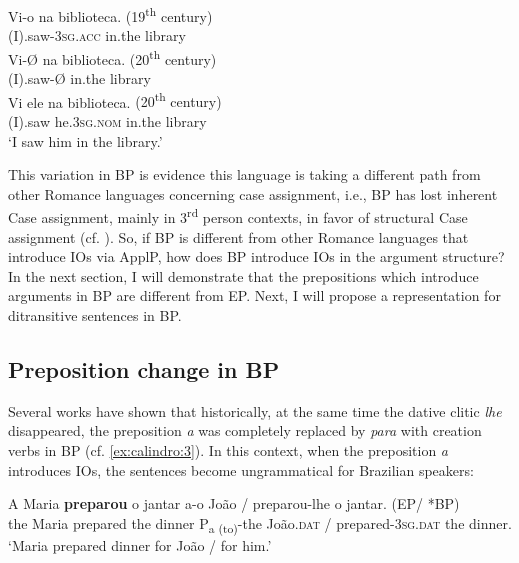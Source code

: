 \documentclass[output=paper,colorlinks,citecolor=brown,nonflat]{./langscibook}
\begin{document}
\ea%
    \label{ex:calindro:10}
    \ea\label{ex:calindro:10a}
    \gll Vi-{o}    na     biblioteca.  \hspace*{8em} {(19\textsuperscript{th} century)}\\
    (I).saw-\textsc{3sg.acc}     in.the     library\\
    \ex\label{ex:calindro:10b}
    \gll Vi-{Ø}    na   biblioteca.   \hspace*{10.5em}   {(20\textsuperscript{th} century)}\\
    (I).saw-Ø  in.the  library\\
    \ex\label{ex:calindro:10c}
    \gll Vi        {ele}                     na        biblioteca.  \hspace*{7em}  {(20\textsuperscript{th} century)}\\
    (I).saw    he.\textsc{3sg.nom}  in.the  library\\
    \glt ‘I saw him in the library.’\hfill \citep[94]{CarvalhoCalindro2018}
    \z
\z

This variation in BP is evidence this language is taking a different path from other Romance languages concerning case assignment, i.e., BP has lost inherent Case assignment, mainly in 3\textsuperscript{rd} person contexts, in favor of structural Case assignment (cf. \citealt{Calindro2015, CarvalhoCalindro2018}). So, if BP is different from other Romance languages that introduce IOs via ApplP, how does BP introduce IOs in the argument structure? In the next section, I will demonstrate that the prepositions which introduce arguments in BP are different from EP. Next, I will propose a representation for ditransitive sentences in BP.

\subsection{Preposition change in BP}\label{sec:calindro:2.2}%

Several works have shown that historically, at the same time the dative clitic \textit{lhe} disappeared, the preposition \textit{a} was completely replaced by \textit{para} with creation verbs in BP (cf. \ref{ex:calindro:3}). In this context, when the preposition \textit{a} introduces IOs, the sentences become ungrammatical for Brazilian speakers:

\ea%
    \label{ex:calindro:11}
    \gll A   Maria \textbf{preparou} o jantar     a-o {João} / preparou-lhe o jantar. \hspace{7cm} (EP/ *BP) \\
    the Maria prepared  the dinner  P{\textsubscript{a (to)}}-the João.\textsc{dat} / prepared-\textsc{3sg.dat} the dinner. { }\\
    \glt `Maria prepared dinner for João / for him.'
    \z
\end{document}
